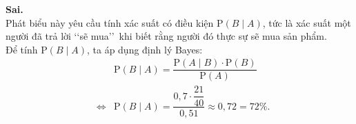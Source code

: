 \begin{ex}
{\begin{itemchoice}
            \itemch \textbf{Sai.}\\
            Phát biểu này yêu cầu tính xác suất có điều kiện $\mathrm{P}(B\mid A)$, tức là xác suất một người đã trả lời \lq\lq  sẽ mua\rq\rq\, khi biết rằng người đó thực sự sẽ mua sản phẩm.
            \\
            Để tính $\mathrm{P}(B \mid A)$, ta áp dụng định lý Bayes:
            \begin{eqnarray*}
                && \mathrm{P}(B \mid A) = \dfrac{\mathrm{P}(A \mid B) \cdot \mathrm{P}(B)}{\mathrm{P}(A)}
                \\
                &\Leftrightarrow& \mathrm{P}(B \mid A) = \dfrac{0{,}7 \cdot \dfrac{21}{40}}{0{,}51}\approx 0{,}72=72\%.
            \end{eqnarray*}
            
        \end{itemchoice}
        
    }
\end{ex}

